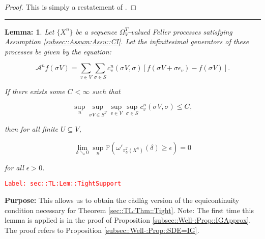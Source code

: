 \documentclass[12pt]{article}
\newcommand{\mb}{\mathbb}
\newcommand{\mc}{\mathcal}
\newcommand{\ep}{\epsilon}
\newcommand{\tr}{\textcolor{red}}
\newcommand{\labe}[1]{\tr{\texttt{Label: #1}}}
\newcommand{\purpose}{\textbf{Purpose: }}
\newcommand{\lin}{\rule{\linewidth}{0.4 pt}}
\newcommand{\pr}{\mb{P}}							%
\renewcommand{\v}{v}							%
\renewcommand{\U}{U}							%
\renewcommand{\S}{S}							%
\newcommand{\s}{\sigma}							%
\newcommand{\sv}[1]{\s^{#1}}					%
\newcommand{\ev}[1]{\ep_{#1}}					%
\newcommand{\T}{T}								%
\newcommand{\OmegaV}[2]{\Omega_{#1}^{#2}}		%
\newcommand{\IG}{\mc{A}}						%
\newcommand{\pup}[1]{^{#1}}							%
\newcommand{\V}{V}									%
\newcommand{\numb}{n}								%
\newcommand{\XState}[1]{\S^{#1}}				%
\newcommand{\piV}[2]{\pi_{#1}^{#2}}					%
\newcommand{\rxvtsn}[3]{X_{#1}^{#3}{#2}}			%
\newcommand{\IGr}[1]{c_{#1}}						%
\newcommand{\const}[1]{C_{#1}}						%
\newtheorem{lem}[thms]{Lemma: }
\begin{document}
\begin{proof}
This is simply a restatement of \cite[Theorem 13.2]{Bil99}.
\end{proof}

\lin

\begin{lem}
Let \(\{\rxvtsn{}{}{\numb}\}\) be a sequence \(\OmegaV{\V}{\T}\)-valued Feller processes satisfying Assumption \ref{subsec::Assum:Assu::CI}. Let the infinitesimal generators of these processes be given by the equation:

\[\IG\pup{\numb}f(\sv{}{\V}) = \sum_{\v\in \V}\sum_{\s \in \S} \IGr{\v}\pup{\numb}(\sv{}{\V},\s)[f(\sv{}{\V} + \s\ev{\v}) - f(\sv{}{\V})].\]

If there exists some \(\const{} < \infty\) such that

\[\sup_{\numb}\sup_{\sv{}{\V}\in \S^\V}\sup_{\v\in\V}\sup_{\s\in \S} \IGr{\v}\pup{\numb}(\sv{}{\V},\s) \leq \const{},\]

then for all finite \(\U \subseteq \V\),

\[\lim_{\delta \searrow 0} \sup_\numb \pr\left(\omega'_{\piV{\U}{\T}\left(\rxvtsn{}{}{\numb}\right)}(\delta) \geq \ep\right) = 0\]

for all \(\ep > 0\).
\label{sec::TL:Lem::TightSupport}
\end{lem}
\labe{sec::TL:Lem::TightSupport}

\purpose This allows us to obtain the c\`adl\`ag version of the equicontinuity condition necessary for Theorem \ref{sec::TL:Thm::Tight}. Note: The first time this lemma is applied is in the proof of Proposition \ref{subsec::Well-:Prop::IGApprox}. The proof refers to Proposition \ref{subsec::Well-:Prop::SDE=IG}.
\end{document}
